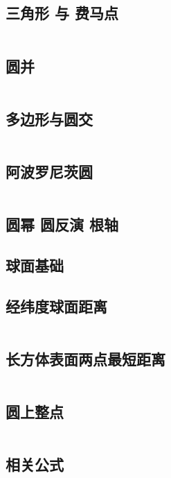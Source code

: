 \documentclass[titlepage, a4paper]{article}
\begin{document}
\begin{multicols}{2}
\begin{spacing}{0.6}
				\subsection{三角形 与 费马点}
				\inputminted{cpp}{src/Geometry/三角形.cpp}
				\subsection{圆并}
				\inputminted{cpp}{src/Geometry/圆并.cpp}
				\subsection{多边形与圆交}
				\inputminted{cpp}{src/Geometry/多边形和圆的交.cpp}
				\subsection{阿波罗尼茨圆}
				\inputminted{cpp}{src/Geometry/阿波罗尼茨圆.tex}
				\subsection{圆幂 圆反演 根轴}
				
				\subsection{球面基础}
				
				\subsection{经纬度球面距离}
				\inputminted{cpp}{src/Geometry/经纬度求球面最短距离.cpp}
				\subsection{长方体表面两点最短距离}
				\inputminted{cpp}{src/Geometry/长方体表面两点最短距离.cpp}
				\subsection{圆上整点}
				\inputminted{cpp}{src/Geometry/圆上整点.cpp}
				\subsection{相关公式}
				
				\newpage

\end{spacing}
\end{multicols}
\end{document}
